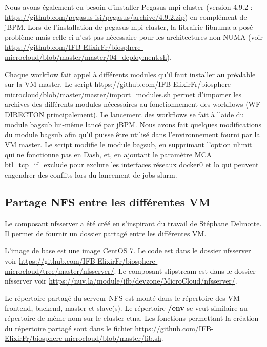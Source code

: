 Nous avons également eu besoin d'installer Pegasus-mpi-cluster (version 4.9.2 : \url{https://github.com/pegasus-isi/pegasus/archive/4.9.2.zip}) en complément de jBPM. Lors de l'installation de pegasus-mpi-cluster, la librairie libnuma a posé problème mais celle-ci n'est pas nécessaire pour les architectures non NUMA (voir \url{https://github.com/IFB-ElixirFr/biosphere-microcloud/blob/master/master/04_deployment.sh}).

\bigskip
Chaque workflow fait appel à différents modules qu'il faut installer au préalable sur la VM master. Le script \url{https://github.com/IFB-ElixirFr/biosphere-microcloud/blob/master/master/import_modules.sh} permet d'importer les archives des différents modules nécessaires au fonctionnement des workflows (WF DIRECTON principalement).
Le lancement des workflows se fait à l'aide du module bagsub lui-même lancé par jBPM. Nous avons fait quelques modifications du module bagsub afin qu'il puisse être utilisé dans l'environnement fourni par la VM master. Le script  modifie le module bagsub, en supprimant l'option ulimit qui ne fonctionne pas en Dash, et, en ajoutant le paramètre MCA btl\_tcp\_if\_exclude pour exclure les interfaces réseaux docker0 et lo qui peuvent engendrer des conflits lors du lancement de jobs slurm.


\subsection{Partage NFS entre les différentes VM} \label{nfsserver}

Le composant nfsserver a été créé en s'inspirant du travail de Stéphane Delmotte.
Il permet de fournir un dossier partagé entre les différentes VM.

L'image de base est une image CentOS 7.
Le code est dans le dossier nfsserver voir  \url{https://github.com/IFB-ElixirFr/biosphere-microcloud/tree/master/nfsserver/}.
Le composant slipstream est dans le dossier nfsserver voir
\url{https://nuv.la/module/ifb/devzone/MicroCloud/nfsserver/}.

Le répertoire partagé  du serveur NFS est monté dans le répertoire 
des VM frontend, backend, master et slave(s).
Le répertoire \textbf{/env} se veut similaire au répertoire de même nom sur le cluster etna. 
Les fonctions permettant la création du répertoire partagé sont dans le fichier \url{https://github.com/IFB-ElixirFr/biosphere-microcloud/blob/master/lib.sh}.

